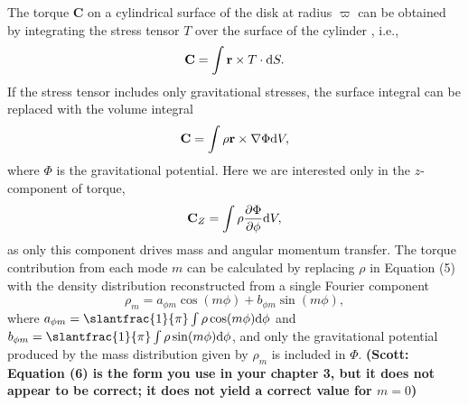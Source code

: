 \documentclass[manuscript]{aastex} %
\begin{document}
The torque {\bf C} on a cylindrical surface of the disk at radius $\varpi$ can be obtained by integrating the stress tensor $T$ over the surface of the cylinder \citep{lyndenbell1972}, i.e.,
\begin{equation}
{\rm {\bf C}} = \int {\bf r} \times T \cdot {\rm d}S.
\end{equation}
If the stress tensor includes only gravitational stresses, the surface integral can be replaced with the volume integral
\begin{equation}
{\rm \bf C} = \int \rho {\bf r} \times \nabla \Phi {\rm d}V,
\end{equation}
where $\Phi$ is the gravitational potential.  Here we are interested only in the $z$-component of torque,  
\begin{equation}
\label{torque1}
{\rm \bf C}_Z = \int \rho \frac{\partial\Phi} {\partial \phi} {\rm d}V,
\end{equation}
as only this component drives mass and angular momentum transfer. The torque contribution from each mode $m$ can be calculated by replacing $\rho$ in Equation (5) with the density distribution reconstructed from a single Fourier component
\begin{equation}
\rho_m = a_{\phi m} \cos(m\phi) + b_{\phi m} \sin(m\phi),
\end{equation}
where $a_{\phi m} =\slantfrac{1}{\pi} \int \rho \cos(m\phi){\rm d}\phi$ and $b_{\phi m} =\slantfrac{1}{\pi} \int \rho \sin(m\phi){\rm d}\phi$, and only the gravitational potential produced by the mass distribution given by $\rho_m$ is included in $\Phi$.
{\bf (Scott: Equation (6) is the form you use in your chapter 3, but it
does not appear to be correct; it does not yield a correct value for $m=0$)}
\end{document}
